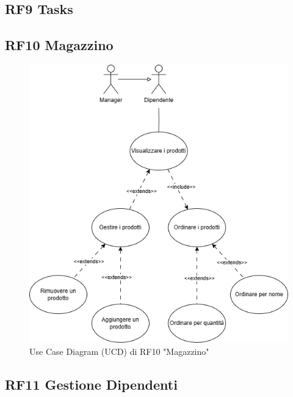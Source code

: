 \documentclass{report}
\begin{document}
\subsection*{RF9 Tasks}

\subsection*{RF10 Magazzino}
\begin{figure}[H]
	\centering\includegraphics[width=1\textwidth]{images/UCD/RF10_magazzino_UCD.png}
	Use Case Diagram (UCD) di RF10 "Magazzino"
\end{figure}

\subsection*{RF11 Gestione Dipendenti}
\end{document}
